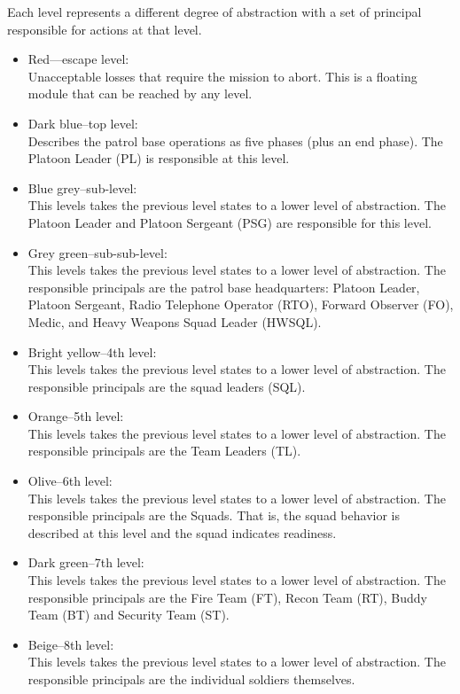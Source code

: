 \documentclass[../../main/main.tex]{subfiles}
\begin{document}
Each level represents a different degree of abstraction with a set of principal responsible for actions at that level. 
\begin{itemize}
\item Red---escape level:\\
Unacceptable losses that require the mission to abort.  This is a floating module that can be reached by any level.
\item Dark blue--top level:\\
Describes the patrol base operations as five phases (plus an end phase).  The Platoon Leader (PL)  is responsible at this level.
\item Blue grey--sub-level:\\
This levels takes the previous level states to a lower level of abstraction.  The Platoon Leader and Platoon Sergeant (PSG) are responsible for this level.
\item Grey green--sub-sub-level:\\
This levels takes the previous level states to a lower level of abstraction.  The responsible principals are the patrol base headquarters: Platoon Leader, Platoon Sergeant, Radio Telephone Operator (RTO), Forward Observer (FO), Medic, and Heavy Weapons Squad Leader (HWSQL).
\item Bright yellow--4th level:\\
This levels takes the previous level states to a lower level of abstraction. The responsible principals are the squad leaders (SQL).
\item Orange--5th level:\\
This levels takes the previous level states to a lower level of abstraction. The responsible principals are the Team Leaders (TL).
\item Olive--6th level:\\
This levels takes the previous level states to a lower level of abstraction.  The responsible principals are the Squads.  That is, the squad behavior is described at this level and the squad indicates readiness.
\item Dark green--7th level:\\
This levels takes the previous level states to a lower level of abstraction. The responsible principals are the Fire Team (FT), Recon Team (RT), Buddy Team (BT) and Security Team (ST).
\item Beige--8th level:\\
This levels takes the previous level states to a lower level of abstraction.  The responsible principals are the individual soldiers themselves.
\end{itemize}
\end{document}
